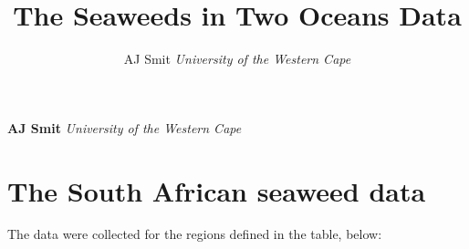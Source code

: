 \documentclass[10pt,a4,]{article}
\title{The Seaweeds in Two Oceans Data  }
\author{\Large AJ
Smit\vspace{0.05in} \newline\normalsize\emph{University of the Western
Cape}  }
\date{}
\newcommand*{\authorfont}{\fontfamily{phv}\selectfont}
\begin{document}

{%
\setlength{\parindent}{0pt}
\thispagestyle{plain}
{\fontsize{18}{20}\selectfont\raggedright
\maketitle  %
}
{
   \vskip 13.5pt\relax \normalsize\fontsize{11}{12}
\textbf{\authorfont AJ Smit} \hskip 15pt \emph{\small University of the
Western Cape}   
}
}



\vskip 6.5pt

\noindent 

\section{The South African seaweed data}

The data were collected for the regions defined in the table, below:
\end{document}
